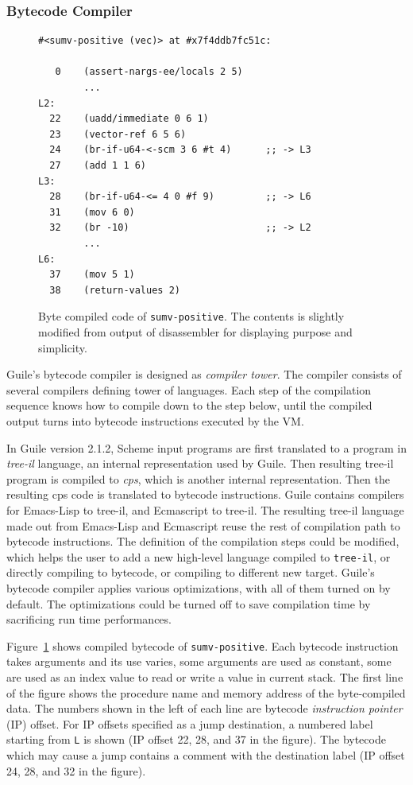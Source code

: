 \documentclass[preprint, 10pt]{sigplanconf}
\begin{document}
\subsubsection{Bytecode Compiler}

\begin{figure}
  \begin{center}
    \small
\begin{verbatim}
#<sumv-positive (vec)> at #x7f4ddb7fc51c:

   0    (assert-nargs-ee/locals 2 5)
        ...
L2:
  22    (uadd/immediate 0 6 1)
  23    (vector-ref 6 5 6)
  24    (br-if-u64-<-scm 3 6 #t 4)      ;; -> L3
  27    (add 1 1 6)
L3:
  28    (br-if-u64-<= 4 0 #f 9)         ;; -> L6
  31    (mov 6 0)
  32    (br -10)                        ;; -> L2
        ...
L6:
  37    (mov 5 1)
  38    (return-values 2)
\end{verbatim}
\end{center}
\caption{Byte compiled code of \texttt{sumv-positive}. The contents is
  slightly modified from output of disassembler for displaying purpose and
  simplicity.}
\label{fig:bytecode}
\end{figure}

Guile's bytecode compiler is designed as \textit{compiler tower}. The compiler
consists of several compilers defining tower of languages. Each step of the
compilation sequence knows how to compile down to the step below, until the
compiled output turns into bytecode instructions executed by the VM.\@

In Guile version 2.1.2, Scheme input programs are first translated to a
program in \textit{tree-il} language, an internal representation used by
Guile. Then resulting tree-il program is compiled to \textit{cps}, which is
another internal representation. Then the resulting cps code is translated to
bytecode instructions. Guile contains compilers for Emacs-Lisp to tree-il, and
Ecmascript to tree-il. The resulting tree-il language made out from Emacs-Lisp
and Ecmascript reuse the rest of compilation path to bytecode
instructions. The definition of the compilation steps could be modified, which
helps the user to add a new high-level language compiled to \texttt{tree-il},
or directly compiling to bytecode, or compiling to different new
target. Guile's bytecode compiler applies various optimizations, with all of
them turned on by default. The optimizations could be turned off to save
compilation time by sacrificing run time performances.

Figure~\hyperref[fig:bytecode]{\ref{fig:bytecode}} shows compiled bytecode of
\texttt{sumv-positive}. Each bytecode instruction takes arguments and its use
varies, some arguments are used as constant, some are used as an index value
to read or write a value in current stack. The first line of the figure shows
the procedure name and memory address of the byte-compiled data.  The numbers
shown in the left of each line are bytecode \textit{instruction pointer} (IP)
offset. For IP offsets specified as a jump destination, a numbered label
starting from \texttt{L} is shown (IP offset 22, 28, and 37 in the
figure). The bytecode which may cause a jump contains a comment with the
destination label (IP offset 24, 28, and 32 in the figure).
\end{document}

